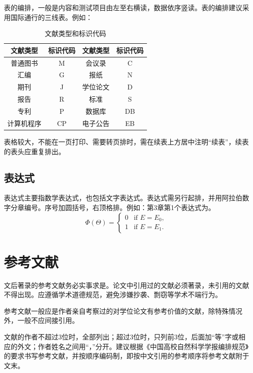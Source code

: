 表的编排，一般是内容和测试项目由左至右横读，数据依序竖读。表的编排建议采用国际通行的三线表。例如：           

\begin{table}[h]
\caption{文献类型和标识代码}  
\label{tab3_1}
\centering
\tabcolsep=20pt
\begin{tabular}{cccc}
\toprule
文献类型 & 标识代码 & 文献类型 & 标识代码\\
\midrule
普通图书 & M & 会议录 & C\\
汇编 & G & 报纸 & N\\
期刊 & J & 学位论文 &     D\\
报告 & R & 标准 & S\\
专利 & P & 数据库 & DB\\
计算机程序 & CP & 电子公告 & EB\\
\bottomrule
\end{tabular}
\end{table}

表格较大，不能在一页打印、需要转页排时，需在续表上方居中注明“续表”，续表的表头应重复排出。

\subsection{表达式}

表达式主要指数学表达式，也包括文字表达式。表达式需另行起排，并用阿拉伯数字分章编号。序号加圆括号，右顶格排。例如：第3章第1个表达式为。
\begin{equation}
  \label{equ3_1}
  \Phi(\Theta )=
  \begin{cases}
    0& \text{if $E=E_0$},\\
    1& \text{if $E=E_1$}.
  \end{cases}
\end{equation}

\section{参考文献}

文后著录的参考文献务必实事求是。论文中引用过的文献必须著录，未引用的文献不得出现。应遵循学术道德规范，避免涉嫌抄袭、剽窃等学术不端行为。

参考文献一般应是作者亲自考察过的对学位论文有参考价值的文献，除特殊情况外，一般不应间接引用。

文献的作者不超过3位时，全部列出；超过3位时，只列前3位，后面加“等”字或相应的外文；作者姓名之间用“，”分开。建议根据《中国高校自然科学学报编排规范》的要求书写参考文献，并按顺序编码制，即按中文引用的参考顺序将参考文献附于文末。

